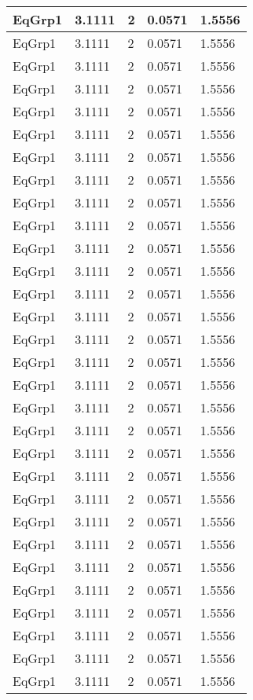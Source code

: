 \documentclass{article}
\begin{document}
\begin{longtable}[l]{|p{1.5cm}|p{3cm}|p{3cm}|p{3cm}|p{3cm}|}
EqGrp1 & 3.1111 & 2 & 0.0571 & 1.5556\\
\hline
EqGrp1 & 3.1111 & 2 & 0.0571 & 1.5556\\
\hline
EqGrp1 & 3.1111 & 2 & 0.0571 & 1.5556\\
\hline
EqGrp1 & 3.1111 & 2 & 0.0571 & 1.5556\\
\hline
EqGrp1 & 3.1111 & 2 & 0.0571 & 1.5556\\
\hline
EqGrp1 & 3.1111 & 2 & 0.0571 & 1.5556\\
\hline
EqGrp1 & 3.1111 & 2 & 0.0571 & 1.5556\\
\hline
EqGrp1 & 3.1111 & 2 & 0.0571 & 1.5556\\
\hline
EqGrp1 & 3.1111 & 2 & 0.0571 & 1.5556\\
\hline
EqGrp1 & 3.1111 & 2 & 0.0571 & 1.5556\\
\hline
EqGrp1 & 3.1111 & 2 & 0.0571 & 1.5556\\
\hline
EqGrp1 & 3.1111 & 2 & 0.0571 & 1.5556\\
\hline
EqGrp1 & 3.1111 & 2 & 0.0571 & 1.5556\\
\hline
EqGrp1 & 3.1111 & 2 & 0.0571 & 1.5556\\
\hline
EqGrp1 & 3.1111 & 2 & 0.0571 & 1.5556\\
\hline
EqGrp1 & 3.1111 & 2 & 0.0571 & 1.5556\\
\hline
EqGrp1 & 3.1111 & 2 & 0.0571 & 1.5556\\
\hline
EqGrp1 & 3.1111 & 2 & 0.0571 & 1.5556\\
\hline
EqGrp1 & 3.1111 & 2 & 0.0571 & 1.5556\\
\hline
EqGrp1 & 3.1111 & 2 & 0.0571 & 1.5556\\
\hline
EqGrp1 & 3.1111 & 2 & 0.0571 & 1.5556\\
\hline
EqGrp1 & 3.1111 & 2 & 0.0571 & 1.5556\\
\hline
EqGrp1 & 3.1111 & 2 & 0.0571 & 1.5556\\
\hline
EqGrp1 & 3.1111 & 2 & 0.0571 & 1.5556\\
\hline
EqGrp1 & 3.1111 & 2 & 0.0571 & 1.5556\\
\hline
EqGrp1 & 3.1111 & 2 & 0.0571 & 1.5556\\
\hline
EqGrp1 & 3.1111 & 2 & 0.0571 & 1.5556\\
\hline
EqGrp1 & 3.1111 & 2 & 0.0571 & 1.5556\\
\hline
EqGrp1 & 3.1111 & 2 & 0.0571 & 1.5556\\
\hline
EqGrp1 & 3.1111 & 2 & 0.0571 & 1.5556\\

\end{longtable}
\end{document}
